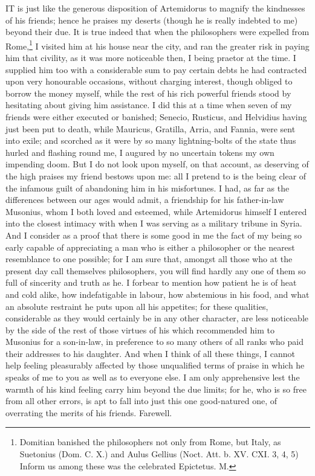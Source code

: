 IT is just like the generous disposition of Artemidorus to magnify the
kindnesses of his friends; hence he praises my deserts (though he is
really indebted to me) beyond their due. It is true indeed that when the
philosophers were expelled from Rome,\footnote{Domitian banished the
philosophers not only from Rome, but Italy, as Suetonius (Dom. C. X.) and
Aulus Gellius (Noct. Att. b. XV. CXI. 3, 4, 5) Inform us among these was
the celebrated Epictetus. M.} I visited him at his
house near the city, and ran the greater risk in paying him that civility,
as it was more noticeable then, I being praetor at the time. I supplied
him too with a considerable sum to pay certain debts he had contracted
upon very honourable occasions, without charging interest, though obliged
to borrow the money myself, while the rest of his rich powerful friends
stood by hesitating about giving him assistance. I did this at a time when
seven of my friends were either executed or banished; Senecio, Rusticus,
and Helvidius having just been put to death, while Mauricus, Gratilla,
Arria, and Fannia, were sent into exile; and scorched as it were by so
many lightning-bolts of the state thus hurled and flashing round me, I
augured by no uncertain tokens my own impending doom. But I do not look
upon myself, on that account, as deserving of the high praises my friend
bestows upon me: all I pretend to is the being clear of the infamous guilt
of abandoning him in his misfortunes. I had, as far as the differences
between our ages would admit, a friendship for his father-in-law Musonius,
whom I both loved and esteemed, while Artemidorus himself I entered into
the closest intimacy with when I was serving as a military tribune in
Syria. And I consider as a proof that there is some good in me the fact of
my being so early capable of appreciating a man who is either a
philosopher or the nearest resemblance to one possible; for I am sure
that, amongst all those who at the present day call themselves
philosophers, you will find hardly any one of them so full of sincerity
and truth as he. I forbear to mention how patient he is of heat and cold
alike, how indefatigable in labour, how abstemious in his food, and what
an absolute restraint he puts upon all his appetites; for these qualities,
considerable as they would certainly be in any other character, are less
noticeable by the side of the rest of those virtues of his which
recommended him to Musonius for a son-in-law, in preference to so many
others of all ranks who paid their addresses to his daughter. And when I
think of all these things, I cannot help feeling pleasurably affected by
those unqualified terms of praise in which he speaks of me to you as well
as to everyone else. I am only apprehensive lest the warmth of his kind
feeling carry him beyond the due limits; for he, who is so free from all
other errors, is apt to fall into just this one good-natured one, of
overrating the merits of his friends. Farewell.

